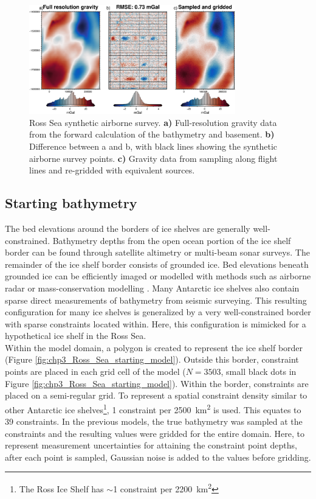 \begin{figure}[!ht]
    \centering
    \includegraphics[width=0.8\textwidth]{figures/chp3/chp3_Ross_Sea_survey.png}
    \caption[Ross Sea synthetic airborne survey]{Ross Sea synthetic airborne survey. \textbf{a)} Full-resolution gravity data from the forward calculation of the bathymetry and basement. \textbf{b)} Difference between a and b, with black lines showing the synthetic airborne survey points. \textbf{c)} Gravity data from sampling along flight lines and re-gridded with equivalent sources.}
    \label{fig:chp3_Ross_Sea_survey}
\end{figure}

\subsection{Starting bathymetry}

The bed elevations around the borders of ice shelves are generally well-constrained. Bathymetry depths from the open ocean portion of the ice shelf border can be found through satellite altimetry or multi-beam sonar surveys. The remainder of the ice shelf border consists of grounded ice. Bed elevations beneath grounded ice can be efficiently imaged or modelled with methods such as airborne radar or mass-conservation modelling \citep{morlighemdeep2020}. Many Antarctic ice shelves also contain sparse direct measurements of bathymetry from seismic surveying. This resulting configuration for many ice shelves is generalized by a very well-constrained border with sparse constraints located within. Here, this configuration is mimicked for a hypothetical ice shelf in the Ross Sea. \\

Within the model domain, a polygon is created to represent the ice shelf border (Figure \ref{fig:chp3_Ross_Sea_starting_model}). Outside this border, constraint points are placed in each grid cell of the model ($N = 3503$, small black dots in Figure \ref{fig:chp3_Ross_Sea_starting_model}). Within the border, constraints are placed on a semi-regular grid. To represent a spatial constraint density similar to other Antarctic ice shelves\footnote{The Ross Ice Shelf has $\sim$1 constraint per 2200~km\textsuperscript{2}}, 1 constraint per 2500~km\textsuperscript{2} is used. This equates to 39 constraints. In the previous models, the true bathymetry was sampled at the constraints and the resulting values were gridded for the entire domain. Here, to represent measurement uncertainties for attaining the constraint point depths, after each point is sampled, Gaussian noise is added to the values before gridding. \\

